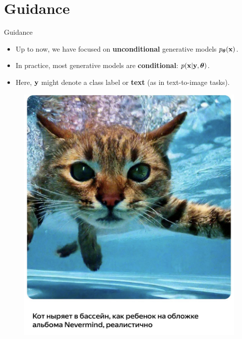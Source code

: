 \documentclass{beamer}
\begin{document}
\section{Guidance}
\begin{frame}{Guidance}
	\begin{itemize}
	\item Up to now, we have focused on \textbf{unconditional} generative models $p_{\boldsymbol{\theta}}(\mathbf{x})$.
	\item In practice, most generative models are \textbf{conditional}: $p(\mathbf{x} | \mathbf{y}, \boldsymbol{\theta})$.
	\item Here, $\mathbf{y}$ might denote a class label or \textbf{text} (as in text-to-image tasks).
	\end{itemize}
	\vspace{-0.3cm}
	\begin{minipage}[t]{0.5\columnwidth}
		\begin{figure}
			\includegraphics[width=0.9\linewidth]{figs/shedevrum1}
		\end{figure}
	\end{minipage}%
	\begin{minipage}[t]{0.5\columnwidth}
		\begin{figure}

\end{figure}
\end{minipage}
\end{frame}
\end{document}
